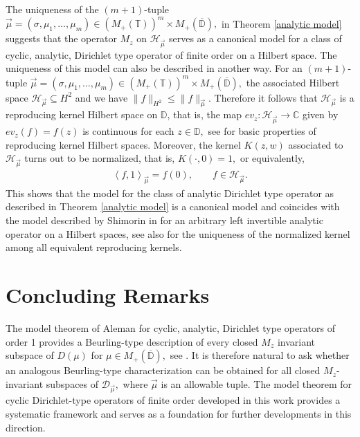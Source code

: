 \documentclass[10pt,oneside,reqno]{amsart}
\theoremstyle{definition}
\theoremstyle{remark}
\newcommand{\ip}[1]{\left\langle #1 \right\rangle}
\newcommand{\D}{\mathbb D}
\numberwithin{equation}{section}
\begin{document}
The uniqueness of the $(m+1)$-tuple  $\overrightarrow{\mu} = \left( \sigma, \mu_{1}, \ldots ,\mu_{m} \right) \in \left(M_+(\mathbb T)\right) ^m \times M_+(\overline{\D}),$ in Theorem \ref{analytic model} suggests that the operator $M_z$ on $\mathscr H_{\overrightarrow{\mu}}$ serves as a canonical model for a class of cyclic, analytic, Dirichlet type operator of finite order on a Hilbert space. The uniqueness of this model can also be described in another way. For an $(m+1)$-tuple  $\overrightarrow{\mu} = \left( \sigma, \mu_{1}, \ldots ,\mu_{m} \right) \in \left(M_+(\mathbb T)\right) ^m \times M_+(\overline{\D}),$ the associated Hilbert space  $\mathscr H_{\overrightarrow{\mu}}\subseteq H^2$ and we have $\|f\|_{H^2} \leqslant \|f\|_{\overrightarrow{\mu}}.$ Therefore it follows that $\mathscr H_{\overrightarrow{\mu}}$ is a reproducing kernel Hilbert space on $\mathbb D$, that is, the map $ev_z:\mathscr H_{\overrightarrow{\mu}} \to \mathbb C$ given by $ev_z(f)=f(z)$ is continuous for each $z\in \D,$ see \cite{zbMATH06562440} for basic properties of reproducing kernel Hilbert spaces. Moreover, the kernel $K(z,w)$ associated to $\mathscr H_{\overrightarrow{\mu}}$ turns out to be normalized, that is, $K(\cdot,0)=1,$ or equivalently, 
\begin{align*}
\ip{f,1}_{\overrightarrow{\mu}}=f(0),\qquad f\in \mathscr H_{\overrightarrow{\mu}}.
\end{align*}
This shows that the model for the class of analytic Dirichlet type operator as described in Theorem \ref{analytic model} is a canonical model and coincides with the model described by Shimorin in \cite[Page~154]{zbMATH01572594} for an arbitrary left invertible analytic operator on a Hilbert spaces, see also \cite[Lemma 4.8]{zbMATH03933844} for the uniqueness of the normalized kernel among all equivalent reproducing kernels. 

\section{Concluding Remarks}

The model theorem of Aleman for cyclic, analytic, Dirichlet type operators of order 1 provides a Beurling-type description of every closed $M_z$ invariant subspace of $D(\mu)$ for $\mu\in M_+(\overline{\D}),$ see \cite[IV, Theorem 4.9]{1993multiplication}. It is therefore natural to ask whether an analogous Beurling-type characterization can be obtained for all closed $M_z$-invariant subspaces of $\mathscr D_{\overrightarrow{\mu}},$ where ${\overrightarrow{\mu}}$ is an allowable tuple. The model theorem for cyclic Dirichlet-type operators of finite order developed in this work provides a systematic framework and serves as a foundation for further developments in this direction.
\end{document}
